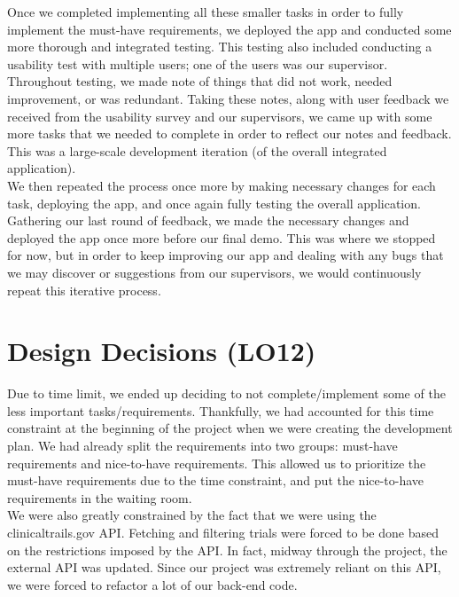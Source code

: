 \documentclass{article}
\begin{document}
Once we completed implementing all these smaller tasks in order to fully implement the must-have 
requirements, we deployed the app and conducted some more thorough and integrated testing. This testing 
also included conducting a usability test with multiple users; one of the users was our supervisor. 
Throughout testing, we made note of things that did not work, needed improvement, or was redundant. 
Taking these notes, along with user feedback we received from the usability survey and our supervisors, 
we came up with some more tasks that we needed to complete in order to reflect our notes and feedback. 
This was a large-scale development iteration (of the overall integrated application).\\

We then repeated the process once more by making necessary changes for each task, deploying the app, 
and once again fully testing the overall application. Gathering our last round of feedback, we made 
the necessary changes and deployed the app once more before our final demo. This was where we stopped 
for now, but in order to keep improving our app and dealing with any bugs that we may discover or 
suggestions from our supervisors, we would continuously repeat this iterative process.

\section{Design Decisions (LO12)}


Due to time limit, we ended up deciding to not complete/implement some of the less important 
tasks/requirements. Thankfully, we had accounted for this time constraint at the beginning of the 
project when we were creating the development plan. We had already split the requirements into two 
groups: must-have requirements and nice-to-have requirements. This allowed us to prioritize the 
must-have requirements due to the time constraint, and put the nice-to-have requirements in the 
waiting room.\\

We were also greatly constrained by the fact that we were using the clinicaltrails.gov API. Fetching 
and filtering trials were forced to be done based on the restrictions imposed by the API. In fact, 
midway through the project, the external API was updated. Since our project was extremely reliant on 
this API, we were forced to refactor a lot of our back-end code.\\
\end{document}
